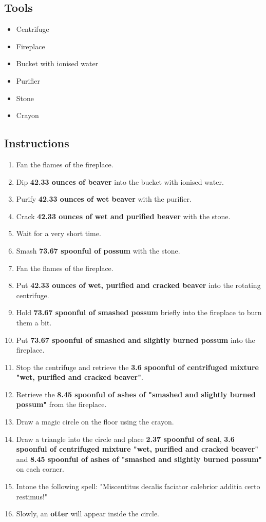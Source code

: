 \documentclass{article}
\begin{document}
\subsection{Tools}\begin{itemize}
\item 
Centrifuge
\item 
Fireplace
\item 
Bucket with ionised water
\item 
Purifier
\item 
Stone
\item 
Crayon
\end{itemize}
\subsection{Instructions}\begin{enumerate}
\item 
Fan the flames of the fireplace.
\item 
Dip \textbf{42.33 ounces of beaver} into the bucket with ionised water.
\item 
Purify \textbf{42.33 ounces of wet beaver} with the purifier.
\item 
Crack \textbf{42.33 ounces of wet and purified beaver} with the stone.
\item 
Wait for a very short time.
\item 
Smash \textbf{73.67 spoonful of possum} with the stone.
\item 
Fan the flames of the fireplace.
\item 
Put \textbf{42.33 ounces of wet, purified and cracked beaver} into the rotating centrifuge.
\item 
Hold \textbf{73.67 spoonful of smashed possum} briefly into the fireplace to burn them a bit.
\item 
Put \textbf{73.67 spoonful of smashed and slightly burned possum} into the fireplace.
\item 
Stop the centrifuge and retrieve the \textbf{3.6 spoonful of centrifuged mixture "wet, purified and cracked beaver"}.
\item 
Retrieve the \textbf{8.45 spoonful of ashes of "smashed and slightly burned possum"} from the fireplace.
\item 
Draw a magic circle on the floor using the crayon.
\item 
Draw a triangle into the circle and place \textbf{2.37 spoonful of seal}, \textbf{3.6 spoonful of centrifuged mixture "wet, purified and cracked beaver"} and \textbf{8.45 spoonful of ashes of "smashed and slightly burned possum"} on each corner.
\item 
Intone the following spell: "Miscentitus decalis faciator calebrior additia certo restimus!"
\item 
Slowly, an \textbf{otter} will appear inside the circle.
\end{enumerate}
\newpage
\end{document}
